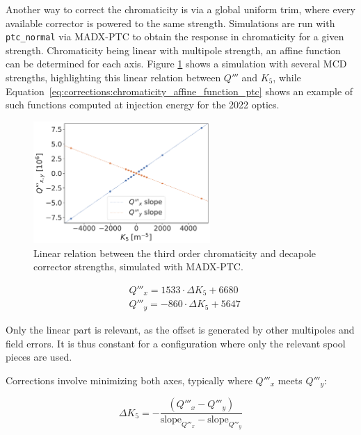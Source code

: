 Another way to correct the chromaticity is via a global uniform trim, where every available
corrector is powered to the same strength.  Simulations are run with \verb|ptc_normal| via MADX-PTC
to obtain the response in chromaticity for a given strength. Chromaticity being linear with
multipole strength, an affine function can be determined for each axis. Figure
\ref{fig:corrections-dq3_versus_k5} shows a simulation with several MCD strengths, highlighting this
linear relation between $Q'''$ and $K_5$, while
Equation~\eqref{eq:corrections:chromaticity_affine_function_ptc} shows an example of such functions computed
at injection energy for the 2022 optics.

\begin{figure}[H]
  \centering
  \includegraphics[width=0.6\textwidth]{images/dq3_k5.pdf}
  \caption{Linear relation between the third order chromaticity and decapole corrector strengths,
           simulated with MADX-PTC.}
  \label{fig:corrections-dq3_versus_k5}
\end{figure}

\begin{equation}
  \begin{aligned}
    &Q'''_x = 1533 \cdot \Delta K_5 + 6680 \\
    &Q'''_y = -860 \cdot \Delta K_5 + 5647
  \end{aligned}
  \label{eq:corrections:chromaticity_affine_function_ptc}
\end{equation}

Only the linear part is relevant, as the offset is generated by other multipoles and field errors.
It is thus constant for a configuration where only the relevant spool pieces are used.

Corrections involve minimizing both axes, typically where $Q'''_x$ meets $Q'''_y$:

\begin{equation}
  \Delta K_5 = -\frac{(Q'''_x - Q'''_y)}{\text{slope}_{Q'''_x} - \text{slope}_{Q'''_y}}
  \label{eq:corrections:chromaticity_global_correction}
\end{equation}